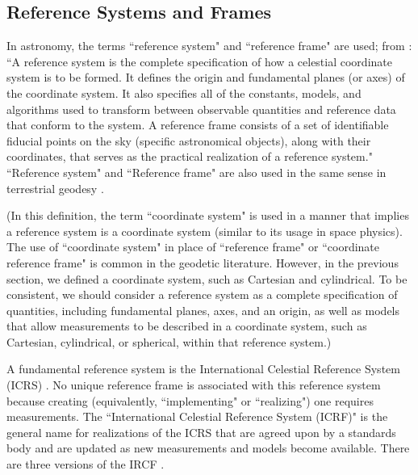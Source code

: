 \documentclass[draft]{agujournal2019}
\begin{document}
\subsection{Reference Systems and Frames}
\label{sect:refsystems}

In astronomy, the terms ``reference system" and ``reference frame" are used; from : ``A reference system is the complete specification of how a celestial coordinate system is to be formed. It defines the origin and fundamental planes (or axes) of the coordinate system. It also specifies all of the constants, models, and algorithms used to transform between observable quantities and reference data that conform to the system. A reference frame consists of a set of identifiable fiducial points on the sky (specific astronomical objects), along with their coordinates, that serves as the practical realization of a reference system." 
``Reference system" and ``Reference frame" are also used in the same sense in terrestrial geodesy \cite{Seitz2014}.

(In this definition, the term ``coordinate system" is used in a manner that implies a reference system is a coordinate system (similar to its usage in space physics). The use of ``coordinate system" in place of ``reference frame" or ``coordinate reference frame" is common in the geodetic literature. However, in the previous section, we defined a coordinate system, such as Cartesian and cylindrical. To be consistent, we should consider a reference system as a complete specification of quantities, including fundamental planes, axes, and an origin, as well as models that allow measurements to be described in a coordinate system, such as Cartesian, cylindrical, or spherical, within that reference system.)


A fundamental reference system is the International Celestial Reference System (ICRS) \cite{Petit2010}. No unique reference frame is associated with this reference system because creating (equivalently, ``implementing" or ``realizing") one requires measurements. The ``International Celestial Reference System (ICRF)" is the general name for realizations of the ICRS that are agreed upon by a standards body and are updated as new measurements and models become available. There are three versions of the IRCF \cite{Charlot2020}. 
\end{document}
